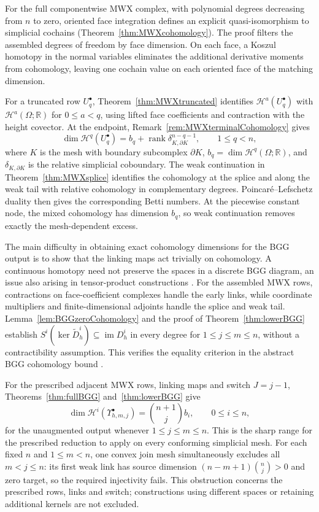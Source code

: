 \documentclass[10pt]{amsart}
\numberwithin{equation}{section}
\begin{document}
For the full componentwise MWX complex, with polynomial degrees decreasing
from $n$ to zero, oriented face integration defines an explicit
quasi-isomorphism to simplicial cochains
(Theorem~\ref{thm:MWXcohomology}). The proof filters the assembled degrees
of freedom by face dimension. On each face, a Koszul homotopy in the
normal variables eliminates the additional derivative moments from
cohomology, leaving one cochain value on each oriented face of the
matching dimension.

For a truncated row $U_q^\bullet$, Theorem~\ref{thm:MWXtruncated}
identifies $\mathscr H^a(U_q^\bullet)$ with $\mathscr H^a(\Omega;\mathbb R)$ for
$0\leq a<q$, using lifted face coefficients and contraction with the
height covector. At the endpoint, Remark~\ref{rem:MWXterminalCohomology} gives
\[
\dim \mathscr H^q(U_q^\bullet)
=b_q+\operatorname{rank}\delta_{K,\partial K}^{n-q-1},
\qquad 1\leq q<n,
\]
where $K$ is the mesh with boundary subcomplex $\partial K$,
$b_q=\dim \mathscr H^q(\Omega;\mathbb R)$, and $\delta_{K,\partial K}$ is
the relative simplicial coboundary.
The weak continuation in Theorem~\ref{thm:MWXsplice} identifies the
cohomology at the splice and along the weak tail with relative cohomology
in complementary degrees. Poincar\'e--Lefschetz duality then gives the
corresponding Betti numbers. At the piecewise constant node, the mixed
cohomology has dimension $b_q$, so weak continuation removes exactly the
mesh-dependent excess.

The main difficulty in obtaining exact cohomology dimensions for the BGG
output is to show that the linking maps act trivially on cohomology. A continuous homotopy need not preserve the
spaces in a discrete BGG diagram, an issue also arising in tensor-product
constructions \cite[Remark~5]{BonizzoniHuKanschatSap2025}.
For the assembled MWX rows, contractions on face-coefficient complexes
handle the early links, while coordinate multipliers and finite-dimensional
adjoints handle the splice and weak tail. Lemma~\ref{lem:BGGzeroCohomology}
and the proof of Theorem~\ref{thm:lowerBGG} establish
$S^i(\ker\widetilde D_h^i)\subseteq\operatorname{im}D_h^i$
in every degree for $1\leq j\leq m\leq n$, without a contractibility
assumption. This verifies the equality criterion in the abstract BGG
cohomology bound \cite[Theorem~6]{ArnoldHu2021}.

For the prescribed adjacent MWX rows, linking maps and switch $J=j-1$,
Theorems~\ref{thm:fullBGG} and~\ref{thm:lowerBGG} give
\[
\dim \mathscr H^i(\Upsilon_{h,m,j}^\bullet)
=\binom{n+1}{j}b_i,\qquad 0\leq i\leq n,
\]
for the unaugmented output whenever $1\leq j\leq m\leq n$.
This is the sharp range for the prescribed reduction to apply on every
conforming simplicial mesh. For each fixed $n$ and $1\leq m<n$, one
convex join mesh simultaneously excludes all $m<j\leq n$: its first weak
link has source dimension $(n-m+1)\binom nj>0$ and zero target, so the
required injectivity fails. This obstruction concerns the prescribed
rows, links and switch; constructions using different spaces or retaining
additional kernels are not excluded.
\end{document}
